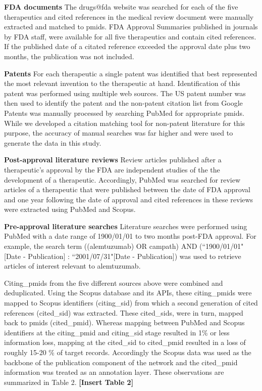 \documentclass[10pt,letterpaper]{article}
\begin{document}
\textbf{FDA documents} The drugs@fda website\cite{bibFDA} was searched for each of the five therapeutics and cited references in the medical review document were manually extracted and matched to pmids. FDA Approval Summaries published in journals by FDA staff, were available for all five therapeutics and contain cited references. If the published date of a citated reference exceeded the approval date plus two months, the publication was not included.

\textbf{Patents} For each therapeutic a single patent was identified that best represented the most relevant invention to the therapeutic at hand. Identification of this patent was performed using multiple web sources. The US patent number was then used to identify the patent and the non-patent citation list from Google Patents \cite{bibGooglePatents} was manually processed by searching PubMed for appropriate pmids. While we developed a citation matching tool for non-patent literature for this purpose, the accuracy of manual searches was far higher and were used to generate the data in this study.

\textbf{Post-approval literature reviews} Review articles published after a therapeutic's approval by the FDA are independent studies of the the development of a therapeutic. Accordingly, PubMed was searched for review articles of a therapeutic that were published between the date of FDA approval and one year following the date of approval and cited references in these reviews were extracted using PubMed and Scopus.

\textbf{Pre-approval literature searches} Literature searches were performed using PubMed with a date range of 1900/01/01 to two months post-FDA approval. For example, the search term ((alemtuzumab) OR campath) AND (``1900/01/01"[Date - Publication] : ``2001/07/31"[Date - Publication]) was used to retrieve articles of interest relevant to alemtuzumab.

Citing\_pmids from the five different sources above  were combined and deduplicated. Using the Scopus database and its APIs, these citing\_pmids were mapped to Scopus identifiers (citing\_sid) from which a second generation of cited references (cited\_sid) was extracted. These cited\_sids, were in turn, mapped back to pmids (cited\_pmid). Whereas mapping between PubMed and Scopus identifiers at the citing\_pmid and citing\_sid stage resulted in 1\% or less information loss, mapping at the cited\_sid to cited\_pmid resulted in a loss of roughly 15-20 \% of target records. Accordingly the Scopus data  was used as the backbone of the publication component of the network and the cited\_pmid information was treated as an annotation layer.  These observations are summarized in Table 2. \textbf{[Insert Table 2]}
\end{document}
